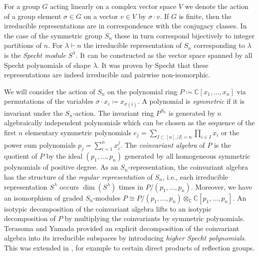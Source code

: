 \documentclass[11pt]{amsart}
\theoremstyle{definition}
\newcommand{\CC}{\mathbb{C}}
\begin{document}
For a group $G$ acting linearly on a complex vector space $V$ we denote the action of a group element $\sigma \in G$ on a vector $v \in V$ by $\sigma \cdot v$.
If $G$ is finite, then the irreducible representations are in correspondence with the conjugacy classes. In the case of the symmetric group $S_n$ these in turn correspond bijectively to integer partitions of $n$. For $\lambda \vdash n$ the irreducible representation of $S_n$ corresponding to $\lambda$ is the \emph{Specht module} $S^\lambda$. It can be constructed as the vector space spanned by all Specht polynomials of shape $\lambda$. It was proven by Specht \cite{Specht} that these representations are indeed irreducible and pairwise non-isomorphic.

We will consider the action of $S_n$ on the polynomial ring $P \coloneqq \CC[x_1,\ldots,x_n]$ via permutations of the variables $\sigma \cdot x_i \coloneqq x_{\sigma(i)}$.
A polynomial is \textit{symmetric} if it is invariant under the $S_n$-action. The invariant ring $P^{S_n}$ is generated by $n$ algebraically independent polynomials which can be chosen as the sequence of the first $n$ elementary symmetric polynomials $e_j= \sum_{I \subset [n], |I| = n} \prod_{i \in I} x_i$ or the power sum polynomials $p_j = \sum_{i=1}^n x_i^j$. The \emph{coinvariant algebra} of $P$ is the quotient of $P$ by the ideal $(p_1,\ldots,p_n)$ generated by all homogeneous symmetric polynomials of positive degree. As an $S_n$-representation, the coinvariant algebra has the structure of the \emph{regular representation} of $S_n$, i.e., each irreducible representation $S^\lambda$ occurs $\dim(S^\lambda)$ times in $P / (p_1,\ldots,p_n)$. Moreover, we have an isomorphism of graded $S_n$-modules $P \cong P/(p_1,\ldots,p_n) \otimes_\CC \CC[p_1,\ldots,p_n]$. An isotypic decomposition of the coinvariant algebra lifts to an isotypic decomposition of $P$ by multiplying the coinvariants by symmetric polynomials. Terasoma and Yamada \cite{Terasoma1993Higher} provided an explicit decomposition of the coinvariant algebra into its irreducible subspaces by introducing \emph{higher Specht polynomials}. This was extended in \cite{Ariki1997Higher}, for example to certain direct products of reflection groups.
\end{document}
